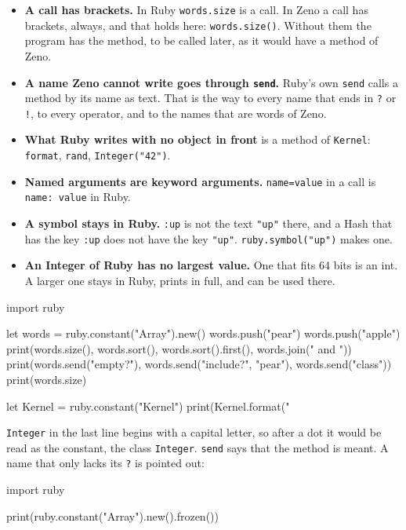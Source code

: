 \begin{itemize}
\item \textbf{A call has brackets.} In Ruby \verb|words.size| is a
  call. In Zeno a call has brackets, always, and that holds here:
  \verb|words.size()|. Without them the program has the method, to be
  called later, as it would have a method of Zeno.
\item \textbf{A name Zeno cannot write goes through \texttt{send}.}
  Ruby's own \verb|send| calls a method by its name as text. That is
  the way to every name that ends in \verb|?| or \verb|!|, to every
  operator, and to the names that are words of Zeno.
\item \textbf{What Ruby writes with no object in front} is a method of
  \verb|Kernel|: \verb|format|, \verb|rand|, \verb|Integer("42")|.
\item \textbf{Named arguments are keyword arguments.}
  \verb|name=value| in a call is \verb|name: value| in Ruby.
\item \textbf{A symbol stays in Ruby.} \verb|:up| is not the text
  \verb|"up"| there, and a Hash that has the key \verb|:up| does not
  have the key \verb|"up"|. \verb|ruby.symbol("up")| makes one.
\item \textbf{An Integer of Ruby has no largest value.} One that fits
  64 bits is an int. A larger one stays in Ruby, prints in full, and
  can be used there.
\end{itemize}

\begin{zeno}[file=words.zeno, dir=ruby]
import ruby

let words = ruby.constant("Array").new()
words.push("pear")
words.push("apple")
print(words.size(), words.sort(), words.sort().first(), words.join(" and "))
print(words.send("empty?"), words.send("include?", "pear"), words.send("class"))
print(words.size)

let Kernel = ruby.constant("Kernel")
print(Kernel.format("%
\end{zeno}

\verb|Integer| in the last line begins with a capital letter, so after
a dot it would be read as the constant, the class \verb|Integer|.
\verb|send| says that the method is meant. A name that only lacks its
\verb|?| is pointed out:

\begin{zeno}[file=frozen.zeno, dir=ruby, fails=yes]
import ruby

print(ruby.constant("Array").new().frozen())
\end{zeno}

